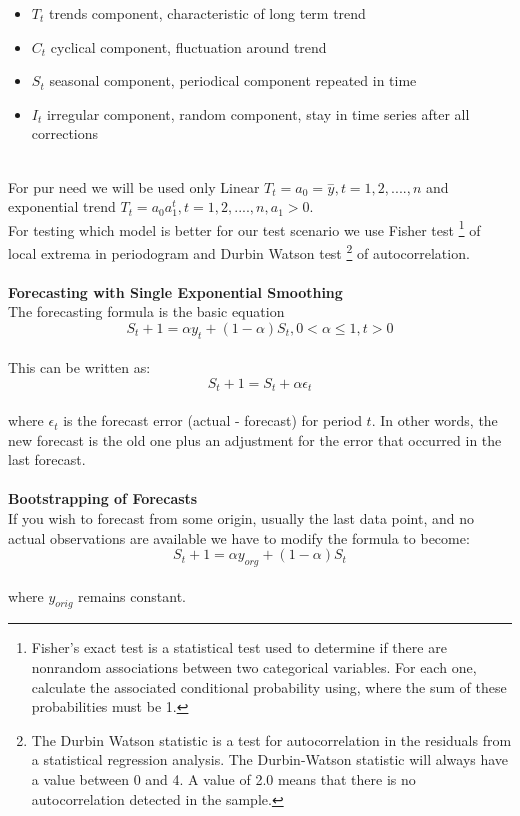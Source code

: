 \begin{itemize}
	\item $T_t$ trends component, characteristic of long term trend
	\item $C_t$ cyclical component, fluctuation around trend
	\item $S_t$ seasonal component, periodical component repeated in time
	\item $I_t$ irregular component, random component, stay in time series after all corrections
\end{itemize}
\\
For pur need we will be used only Linear $T_t = a_0 = \overset{-}{y}, t = 1,2, ...., n$ and exponential trend
$T_t = a_{0}a_1^t, t = 1,2,....,n, a_1 > 0$.
\\
For testing which model is better for our test scenario we use Fisher test \footnote{Fisher's exact test is a statistical test
used to determine if there are nonrandom associations between two categorical variables.
For each one, calculate the associated conditional probability using, where the sum of these probabilities must be 1.} of local extrema
in periodogram and Durbin Watson test \footnote{The Durbin Watson statistic is a test for autocorrelation in the residuals
from a statistical regression analysis.
The Durbin-Watson statistic will always have a value between 0 and 4.
A value of 2.0 means that there is no autocorrelation detected in the sample.} of autocorrelation.\\
\\
\textbf{Forecasting with Single Exponential Smoothing} \label{subsec:statistics_forecast}
\\
The forecasting formula is the basic equation
\begin{equation} \label{eq:21}
S_t+1 = \alpha y_t+(1−\alpha)S_t, 0< \alpha \leq 1,t>0
\end{equation}
\\
This can be written as:
\begin{equation} \label{eq:22}
S_t+1=S_t+\alpha \epsilon_t
\end{equation}
\\
where $\epsilon_t$ is the forecast error (actual - forecast) for period $t$.
In other words, the new forecast is the old one plus an adjustment for the error that occurred in the last forecast.\\
\\
\textbf{Bootstrapping of Forecasts}\\
If you wish to forecast from some origin, usually the last data point, and no actual observations are available
we have to modify the formula to become:
\\
\begin{equation} \label{eq:23}
S_t+1 = \alpha y_{org}+(1−\alpha)S_t
\end{equation}
\\
where $y_{orig}$ remains constant.
